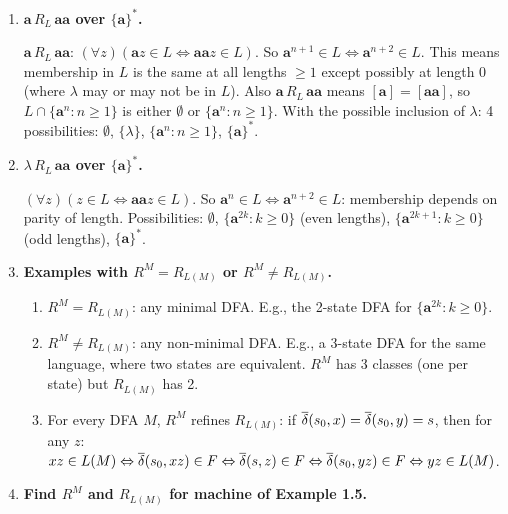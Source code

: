 \begin{enumerate}[{2.}1.]
\item \textbf{$\mathbf{a}\,R_L\,\mathbf{aa}$ over $\{\mathbf{a}\}^*$.}

$\mathbf{a}\,R_L\,\mathbf{aa}$: $(\forall z)(\mathbf{a}z\in L\Leftrightarrow\mathbf{aa}z\in L)$. So $\mathbf{a}^{n+1}\in L\Leftrightarrow\mathbf{a}^{n+2}\in L$. This means membership in $L$ is the same at all lengths $\geq 1$ except possibly at length 0 (where $\lambda$ may or may not be in $L$). Also $\mathbf{a}\,R_L\,\mathbf{aa}$ means $[\mathbf{a}]=[\mathbf{aa}]$, so $L\cap\{\mathbf{a}^n:n\geq 1\}$ is either $\emptyset$ or $\{\mathbf{a}^n:n\geq 1\}$. With the possible inclusion of $\lambda$: 4 possibilities: $\emptyset$, $\{\lambda\}$, $\{\mathbf{a}^n:n\geq 1\}$, $\{\mathbf{a}\}^*$.

\item \textbf{$\lambda\,R_L\,\mathbf{aa}$ over $\{\mathbf{a}\}^*$.}

$(\forall z)(z\in L\Leftrightarrow\mathbf{aa}z\in L)$. So $\mathbf{a}^n\in L\Leftrightarrow\mathbf{a}^{n+2}\in L$: membership depends on parity of length. Possibilities: $\emptyset$, $\{\mathbf{a}^{2k}:k\geq 0\}$ (even lengths), $\{\mathbf{a}^{2k+1}:k\geq 0\}$ (odd lengths), $\{\mathbf{a}\}^*$.

\item \textbf{Examples with $R^M=R_{L(M)}$ or $R^M\neq R_{L(M)}$.}

\begin{enumerate}
\item $R^M=R_{L(M)}$: any minimal DFA. E.g., the 2-state DFA for $\{\mathbf{a}^{2k}:k\geq 0\}$.

\item $R^M\neq R_{L(M)}$: any non-minimal DFA. E.g., a 3-state DFA for the same language, where two states are equivalent. $R^M$ has 3 classes (one per state) but $R_{L(M)}$ has 2.

\item For every DFA $M$, $R^M$ refines $R_{L(M)}$: if $\overline{\delta}(s_0,x)=\overline{\delta}(s_0,y)=s$, then for any $z$: $xz\in L(M)\Leftrightarrow\overline{\delta}(s_0,xz)\in F\Leftrightarrow\overline{\delta}(s,z)\in F\Leftrightarrow\overline{\delta}(s_0,yz)\in F\Leftrightarrow yz\in L(M)$.
\end{enumerate}

\item \textbf{Find $R^M$ and $R_{L(M)}$ for machine of Example 1.5.}


\end{enumerate}
